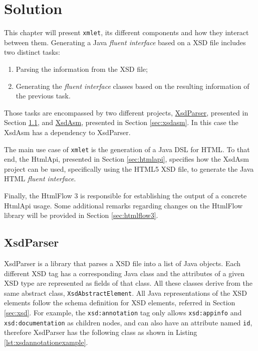 \chapter{Solution}
\label{cha:solution}

\sloppy

This chapter will present \texttt{xmlet}, its different components and how they interact between them. Generating a Java \textit{fluent interface} based on a \ac{XSD} file includes two distinct tasks:

\begin{enumerate}
	\item Parsing the information from the \ac{XSD} file;
	\item Generating the \textit{fluent interface} classes based on the resulting information of the previous task.
\end{enumerate}

\noindent
Those tasks are encompassed by two different projects, \hyperref[sec:xsdparser]{XsdParser}, presented in Section \ref{sec:xsdparser}, and \hyperref[sec:xsdasm]{XsdAsm}, presented in Section \ref{sec:xsdasm}. In this case the XsdAsm has a dependency to XsdParser.

\noindent
The main use case of \texttt{xmlet} is the generation of a Java \ac{DSL} for \ac{HTML}. To that end, the HtmlApi, presented in Section \ref{sec:htmlapi}, specifies how the XsdAsm project can be used, specifically using the \ac{HTML}5 \ac{XSD} file, to generate the Java \ac{HTML} \textit{fluent interface}.

\noindent
Finally, the HtmlFlow 3 is responsible for establishing the output of a concrete HtmlApi usage. Some additional remarks regarding changes on the HtmlFlow library will be provided in Section \ref{sec:htmlflow3}.

\section{XsdParser} %
\label{sec:xsdparser}

XsdParser is a library that parses a \ac{XSD} file into a list of Java objects. Each different \ac{XSD} tag has a corresponding Java class and the  attributes of a given \ac{XSD} type are represented as fields of that class. All these classes derive from the same abstract class, \texttt{XsdAbstractElement}. All Java representations of the \ac{XSD} elements follow the schema definition for \ac{XSD} elements, referred in Section \ref{sec:xsd}. For example, the \texttt{xsd:annotation} tag only allows \texttt{xsd:appinfo} and \texttt{xsd:documentation} as children nodes, and can also have an attribute named \texttt{id}, therefore XsdParser has the following class as shown in Listing \ref{lst:xsdannotationexample}.

